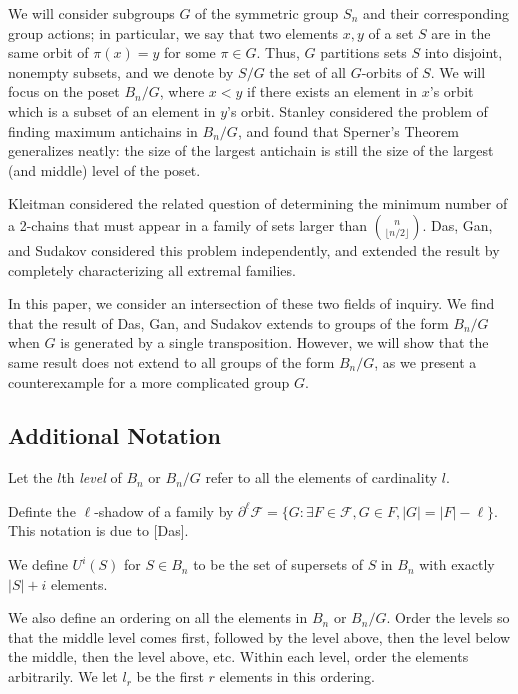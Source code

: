 \documentclass[12pt]{article}
\theoremstyle{plain}
\theoremstyle{definition}
\theoremstyle{remark}
\newcommand{\F}{\mathcal{F}}
\begin{document}
We will consider subgroups $G$ of the symmetric group $S_n$ and their corresponding group actions; in particular, we say that two elements $x, y$ of a set $S$ are in the same orbit of $\pi(x) = y$ for some $\pi \in G$. Thus, $G$ partitions sets $S$ into disjoint, nonempty subsets, and we denote by $S / G$ the set of all $G$-orbits of $S$. We will focus on the poset $B_n / G$, where $x < y$ if there exists an element in $x$'s orbit which is a subset of an element in $y$'s orbit. Stanley considered the problem of finding maximum antichains in $B_n / G$, and found that Sperner's Theorem generalizes neatly: the size of the largest antichain is still the size of the largest (and middle) level of the poset.

Kleitman considered the related question of determining the minimum number of a 2-chains that must appear in a family of sets larger than $\binom{n}{\lfloor n/2 \rfloor}$. Das, Gan, and Sudakov considered this problem independently, and extended the result by completely characterizing all extremal families. 

In this paper, we consider an intersection of these two fields of inquiry. We find that the result of Das, Gan, and Sudakov extends to groups of the form $B_n / G$ when $G$ is generated by a single transposition. However, we will show that the same result does not extend to all groups of the form $B_n / G$, as we present a counterexample for a more complicated group $G$. 

\subsection{Additional Notation}

Let the $l$th \emph{level} of $B_n$ or $B_n / G$ refer to all the elements of cardinality $l$.

Definte the $\ell$-shadow of a family by $\partial^{\ell}\F = \{G: \exists F \in \F, G \in F, |G| = |F| - \ell\}$. This notation is due to [Das].

We define $U^i(S)$ for $S \in B_n$ to be the set of supersets of $S$ in $B_n$ with exactly $|S| + i$ elements.

We also define an ordering on all the elements in $B_n$ or $B_n/ G$. Order the levels so that the middle level comes first, followed by the level above, then the level below the middle, then the level above, etc. Within each level, order the elements arbitrarily. We let $l_r$ be the first $r$ elements in this ordering. 


\end{document}
